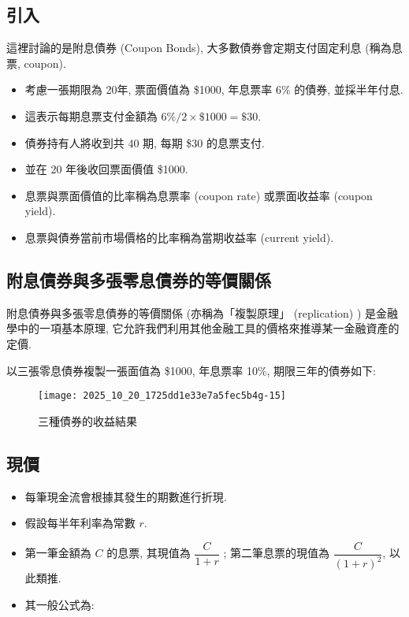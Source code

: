 \documentclass[letterpaper]{article}
\begin{document}
		\subsection{引入}
		這裡討論的是附息債券  (Coupon Bonds), 大多數債券會定期支付固定利息 (稱為息票, coupon).  
		
		\begin{itemize}
			\item 考慮一張期限為 20年, 票面價值為 \$1000, 年息票率 \(6\%\) 的債券, 並採半年付息.  
			\item 這表示每期息票支付金額為 \(6\% / 2 \times \$1000 = \$30\).  
			\item 債券持有人將收到共 40 期, 每期 \$30 的息票支付.  
			\item 並在 20 年後收回票面價值 \$1000.  
			\item 息票與票面價值的比率稱為息票率 (coupon rate) 或票面收益率 (coupon yield).  
			\item 息票與債券當前市場價格的比率稱為當期收益率 (current yield).  
		\end{itemize}
		
		
		\subsection{附息債券與多張零息債券的等價關係}
		
		附息債券與多張零息債券的等價關係 (亦稱為「複製原理」 (replication) ) 是金融學中的一項基本原理, 它允許我們利用其他金融工具的價格來推導某一金融資產的定價.  
		
		以三張零息債券複製一張面值為 \$1000, 年息票率 10\%, 期限三年的債券如下: 
		
		
		\begin{figure}[h]
			\begin{center}
				\texttt{[image: 2025\_10\_20\_1725dd1e33e7a5fec5b4g-15]}
				\caption{三種債券的收益結果}
			\end{center}
		\end{figure}
		
		\subsection{現價}
		\begin{itemize}
			\item 每筆現金流會根據其發生的期數進行折現.  
			\item 假設每半年利率為常數 \( r \).  
			\item 第一筆金額為 \( C \) 的息票, 其現值為 \(\dfrac{C}{1 + r}\) ; 第二筆息票的現值為 \(\dfrac{C}{ (1 + r) ^{2}}\), 以此類推.  
			\item 其一般公式為: 
		\end{itemize}
		
\end{document}
